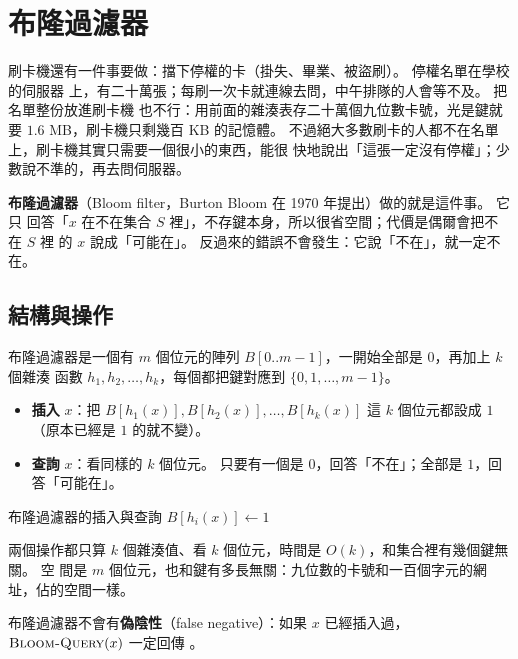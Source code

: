 \section{布隆過濾器}
\label{sec:hash-bloom}

刷卡機還有一件事要做：擋下停權的卡（掛失、畢業、被盜刷）。 停權名單在學校的伺服器
上，有二十萬張；每刷一次卡就連線去問，中午排隊的人會等不及。 把名單整份放進刷卡機
也不行：用前面的雜湊表存二十萬個九位數卡號，光是鍵就要 $1.6$ MB，刷卡機只剩幾百 KB
的記憶體。 不過絕大多數刷卡的人都不在名單上，刷卡機其實只需要一個很小的東西，能很
快地說出「這張一定沒有停權」；少數說不準的，再去問伺服器。

\textbf{布隆過濾器}（Bloom filter，Burton Bloom 在 1970 年提出）做的就是這件事。 它只
回答「$x$ 在不在集合 $S$ 裡」，不存鍵本身，所以很省空間；代價是偶爾會把不在 $S$ 裡
的 $x$ 說成「可能在」。 反過來的錯誤不會發生：它說「不在」，就一定不在。

\subsection{結構與操作}

布隆過濾器是一個有 $m$ 個位元的陣列 $B[0..m-1]$，一開始全部是 $0$，再加上 $k$ 個雜湊
函數 $h_1, h_2, \ldots, h_k$，每個都把鍵對應到 $\{0, 1, \ldots, m - 1\}$。
\begin{itemize}
\item \textbf{插入} $x$：把 $B[h_1(x)], B[h_2(x)], \ldots, B[h_k(x)]$ 這 $k$ 個位元都設成
$1$（原本已經是 $1$ 的就不變）。
\item \textbf{查詢} $x$：看同樣的 $k$ 個位元。 只要有一個是 $0$，回答「不在」；全部是
$1$，回答「可能在」。
\end{itemize}

\begin{pseudo}[label=alg:hash-bloom]{布隆過濾器的插入與查詢}
        \State $B[h_i(x)] \gets 1$
    \EndFor
\EndProcedure
{}
            \State \Return \FALSE {}
        \EndIf
    \EndFor
    \State \Return \TRUE {}
\EndFunction
\end{pseudo}

兩個操作都只算 $k$ 個雜湊值、看 $k$ 個位元，時間是 $O(k)$，和集合裡有幾個鍵無關。 空
間是 $m$ 個位元，也和鍵有多長無關：九位數的卡號和一百個字元的網址，佔的空間一樣。

\begin{theorem}
\label{thm:hash-bloom-noneg}
布隆過濾器不會有\textbf{偽陰性}（false negative）：如果 $x$ 已經插入過，
$\proc{Bloom-Query}(x)$ 一定回傳 \TRUE。
\end{theorem}

